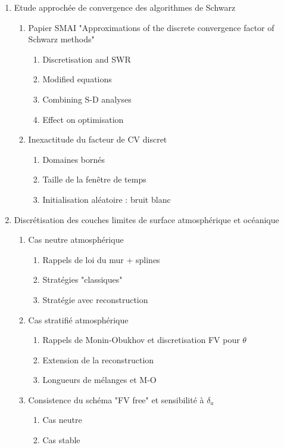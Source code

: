 \documentclass{article}
\begin{document}
\begin{enumerate}
\begin{enumerate}
	\end{enumerate}
\item Etude approchée de convergence des algorithmes de Schwarz
	\begin{enumerate}
		\item Papier SMAI "Approximations of the discrete
			convergence factor of Schwarz methods"
			\begin{enumerate}
					\item Discretisation and SWR
					\item Modified equations
					\item Combining S-D analyses
					\item Effect on optimisation
			\end{enumerate}
		\item Inexactitude du facteur de CV discret
			\begin{enumerate}
				\item Domaines bornés
				\item Taille de la fenêtre de temps
				\item Initialisation aléatoire :
					bruit blanc 	
			\end{enumerate}
	\end{enumerate}
\item Discrétisation des couches limites de surface atmosphérique
	et océanique
	\begin{enumerate}
		\item Cas neutre atmosphérique
			\begin{enumerate}
				\item Rappels de loi du mur + splines
				\item Stratégies "classiques"
				\item Stratégie avec reconstruction
			\end{enumerate}
		\item Cas stratifié atmosphérique
			\begin{enumerate}
				\item Rappels de Monin-Obukhov
					et discretisation FV pour 
					$\theta$
				\item Extension de la reconstruction
				\item Longueurs de mélanges et M-O
			\end{enumerate}
		\item Consistence du schéma "FV free"
			et sensibilité à $\delta_a$
			\begin{enumerate}
				\item Cas neutre
				\item Cas stable

\end{enumerate}
\end{enumerate}
\end{enumerate}
\end{document}
